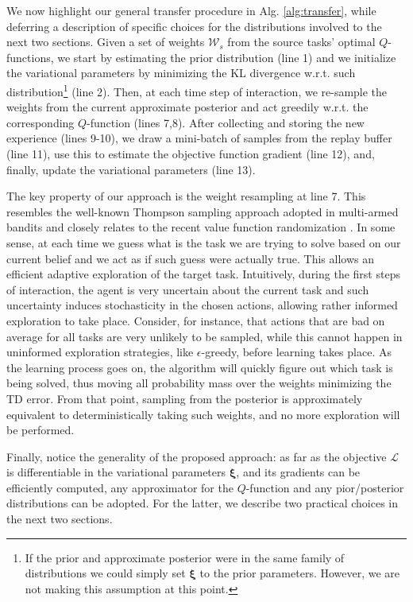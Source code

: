 \documentclass{article}
\begin{document}
We now highlight our general transfer procedure in Alg. \ref{alg:transfer}, while deferring a description of specific choices for the distributions involved to the next two sections. Given a set of weights $\mathcal{W}_s$ from the source tasks' optimal $Q$-functions, we start by estimating the prior distribution (line 1) and we initialize the variational parameters by minimizing the KL divergence w.r.t. such distribution\footnote{If the prior and approximate posterior were in the same family of distributions we could simply set $\bm{\xi}$ to the prior parameters. However, we are not making this assumption at this point.} (line 2). Then, at each time step of interaction, we re-sample the weights from the current approximate posterior and act greedily w.r.t. the corresponding $Q$-function (lines 7,8). After collecting and storing the new experience (lines 9-10), we draw a mini-batch of samples from the replay buffer (line 11), use this to estimate the objective function gradient (line 12), and, finally, update the variational parameters (line 13).

The key property of our approach is the weight resampling at line 7. This resembles the well-known Thompson sampling approach adopted in multi-armed bandits \cite{bubeck2012regret} and closely relates to the recent value function randomization \cite{osband2014generalization}. In some sense, at each time we guess what is the task we are trying to solve based on our current belief and we act as if such guess were actually true. This allows an efficient adaptive exploration of the target task. Intuitively, during the first steps of interaction, the agent is very uncertain about the current task and such uncertainty induces stochasticity in the chosen actions, allowing rather informed exploration to take place. Consider, for instance, that actions that are bad on average for all tasks are very unlikely to be sampled, while this cannot happen in uninformed exploration strategies, like $\epsilon$-greedy, before learning takes place. As the learning process goes on, the algorithm will quickly figure out which task is being solved, thus moving all probability mass over the weights minimizing the TD error. From that point, sampling from the posterior is approximately equivalent to deterministically taking such weights, and no more exploration will be performed.

Finally, notice the generality of the proposed approach: as far as the objective $\mathcal{L}$ is differentiable in the variational parameters $\bm{\xi}$, and its gradients can be efficiently computed, any approximator for the $Q$-function and any pior/posterior distributions can be adopted. For the latter, we describe two practical choices in the next two sections.
\end{document}
